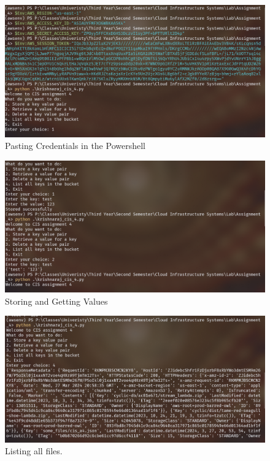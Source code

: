 \documentclass[11pt]{article}
\begin{document}
\begin{figure}[H]
    \centering
    \includegraphics[width=.95\textwidth]{putting_credentials.png}
    \caption{Pasting Credentials in the Powershell}
\end{figure}


\begin{figure}[H]
    \centering
    \includegraphics[width=.95\textwidth]{store and get values.png}
    \caption{Storing and Getting Values}
\end{figure}

\begin{figure}[H]
    \centering
    \includegraphics[width=.95\textwidth]{get all values.png}
    \caption{Listing all files. }
\end{figure}
\end{document}
